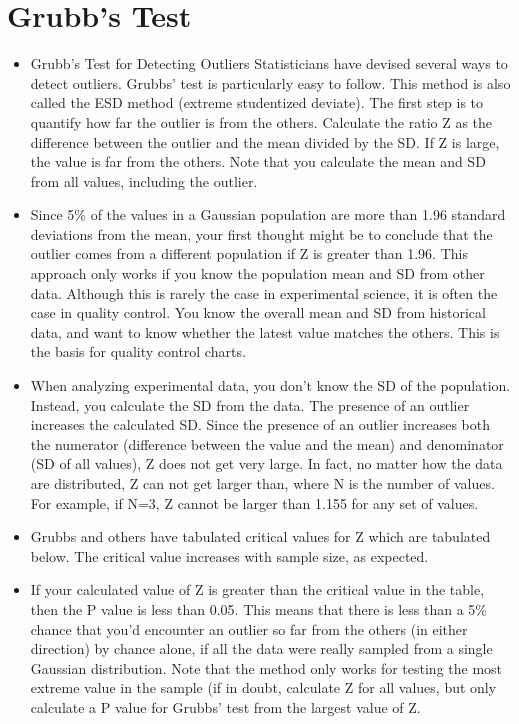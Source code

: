 \documentclass[a4paper,12pt]{article}
\begin{document}
\section{Grubb's Test}

\begin{itemize}
\item Grubb's Test for Detecting Outliers
Statisticians have devised several ways to detect outliers. Grubbs' test is particularly easy to follow. This method is also called the ESD method (extreme studentized deviate).
The first step is to quantify how far the outlier is from the others. Calculate the ratio Z as the difference between the outlier and the mean divided by the SD. If Z is large, the value is far from the others. Note that you calculate the mean and SD from all values, including the outlier.

\item Since 5\% of the values in a Gaussian population are more than 1.96 standard deviations from the mean, your first thought might be to conclude that the outlier comes from a different population if Z is greater than 1.96. This approach only works if you know the population mean and SD from other data. Although this is rarely the case in experimental science, it is often the case in quality control. You know the overall mean and SD from historical data, and want to know whether the latest value matches the others. This is the basis for quality control charts.
\item 
When analyzing experimental data, you don't know the SD of the population. Instead, you calculate the SD from the data. The presence of an outlier increases the calculated SD. Since the presence of an outlier increases both the numerator (difference between the value and the mean) and denominator (SD of all values), Z does not get very large. In fact, no matter how the data are distributed, Z can not get larger than, where N is the number of values. For example, if N=3, Z cannot be larger than 1.155 for any set of values.

\item 
Grubbs and others have tabulated critical values for Z which are tabulated below. The critical value increases with sample size, as expected.

\item 
If your calculated value of Z is greater than the critical value in the table, then the P value is less than 0.05. This means that there is less than a 5\% chance that you'd encounter an outlier so far from the others (in either direction) by chance alone, if all the data were really sampled from a single Gaussian distribution. Note that the method only works for testing the most extreme value in the sample (if in doubt, calculate Z for all values, but only calculate a P value for Grubbs' test from the largest value of Z.


\end{itemize}
\end{document}
